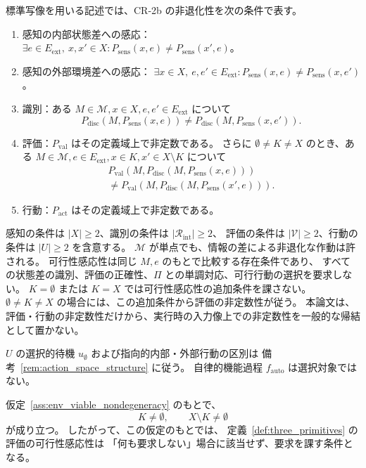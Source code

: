 \begin{definition}
標準写像を用いる記述では、CR-2b の非退化性を次の条件で表す。
\begin{enumerate}
\item 感知の内部状態差への感応：
$\exists e\in E_{\mathrm{ext}},\ x,x'\in X:
P_{\mathrm{sens}}(x,e)\ne P_{\mathrm{sens}}(x',e)$。
\item 感知の外部環境差への感応：
$\exists x\in X,\ e,e'\in E_{\mathrm{ext}}:
P_{\mathrm{sens}}(x,e)\ne P_{\mathrm{sens}}(x,e')$。
\item 識別：ある $M\in\mathcal M,x\in X,e,e'\in E_{\mathrm{ext}}$ について
\[
P_{\mathrm{disc}}(M,P_{\mathrm{sens}}(x,e))
\ne P_{\mathrm{disc}}(M,P_{\mathrm{sens}}(x,e')).
\]
\item 評価：$P_{\mathrm{val}}$ はその定義域上で非定数である。
さらに $\emptyset\ne K\ne X$ のとき、ある
$M\in\mathcal M,e\in E_{\mathrm{ext}},x\in K,x'\in X\setminus K$ について
\[
\begin{split}
P_{\mathrm{val}}(M,P_{\mathrm{disc}}(M,P_{\mathrm{sens}}(x,e)))\\
\ne P_{\mathrm{val}}(M,P_{\mathrm{disc}}(M,P_{\mathrm{sens}}(x',e))).
\end{split}
\]
\item 行動：$P_{\mathrm{act}}$ はその定義域上で非定数である。
\end{enumerate}
感知の条件は $|X|\ge2$、識別の条件は $|\mathcal R_{\mathrm{int}}|\ge2$、
評価の条件は $|\mathcal V|\ge2$、行動の条件は $|U|\ge2$ を含意する。
$\mathcal M$ が単点でも、情報の差による非退化な作動は許される。
可行性感応性は同じ $M,e$ のもとで比較する存在条件であり、
すべての状態差の識別、評価の正確性、$\Pi$ との単調対応、可行行動の選択を要求しない。
$K=\emptyset$ または $K=X$ では可行性感応性の追加条件を課さない。
$\emptyset\ne K\ne X$ の場合には、この追加条件から評価の非定数性が従う。
本論文は、評価・行動の非定数性だけから、実行時の入力像上での非定数性を一般的な帰結として置かない。

$U$ の選択的待機 $u_\emptyset$ および指向的内部・外部行動の区別は
備考~\ref{rem:action_space_structure} に従う。
自律的機能過程 $f_{\mathrm{auto}}$ は選択対象ではない。
\end{definition}

\begin{proposition}[評価の可行性感応性が要求を課す範囲]
\label{prop:feasibility_sensitivity_scope}
仮定~\ref{ass:env_viable_nondegeneracy} のもとで、
\[
  K\neq\emptyset,
  \qquad
  X\setminus K\neq\emptyset
\]
が成り立つ。
したがって、この仮定のもとでは、
定義~\ref{def:three_primitives} の評価の可行性感応性は
「何も要求しない」場合に該当せず、要求を課す条件となる。
\end{proposition}

